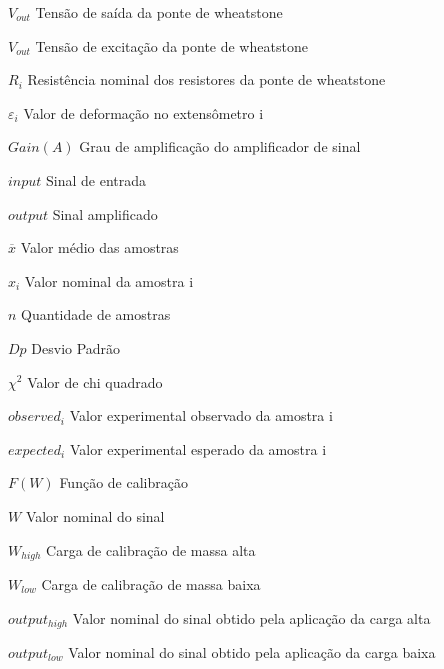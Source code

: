\begin{simbolos}
    \item[$ V_{out} $] {Tensão de saída da ponte de wheatstone}
    \item[$ V_{out} $] {Tensão de excitação da ponte de wheatstone}
    \item[$ R_i $] {Resistência nominal dos resistores da ponte de wheatstone}

    \item[$ \varepsilon_{i} $] {Valor de deformação no extensômetro i}

    \item[$ Gain(A) $] {Grau de amplificação do amplificador de sinal}
    \item[$ input $] {Sinal de entrada}
    \item[$ output $] {Sinal amplificado}

    \item[$ \overline{x} $] {Valor médio das amostras}
    \item[$ x_i $] {Valor nominal da amostra i}
    \item[$ n $] {Quantidade de amostras}

    \item[$ Dp $] {Desvio Padrão}

    \item[$ \chi^{2} $] {Valor de chi quadrado}
    \item[$ observed_i $] {Valor experimental observado da amostra i}
    \item[$ expected_i $] {Valor experimental esperado da amostra i}

    \item[$ F(W) $] {Função de calibração}
    \item[$ W $] {Valor nominal do sinal}
    \item[$ W_{high} $] {Carga de calibração de massa alta}
    \item[$ W_{low} $] {Carga de calibração de massa baixa}
    \item[$ output_{high} $] {Valor nominal do sinal obtido pela aplicação da carga alta}
    \item[$ output_{low} $] {Valor nominal do sinal obtido pela aplicação da carga baixa}

\end{simbolos}
